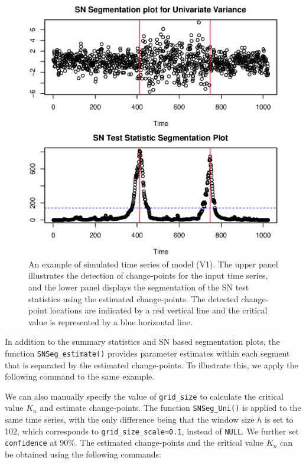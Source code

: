 \begin{figure}[!h]
	\centering
	\includegraphics[scale=0.5]{uni_var.eps}
	\caption{An example of simulated time series of model (V1). The upper panel illustrates the detection of change-points for the input time series, and the lower panel displays the segmentation of the SN test statistics using the estimated change-points. The detected change-point locations are indicated by a red vertical line and the critical value is represented by a blue horizontal line.}
	\label{fig:SN-uni-single-var}
\end{figure}

{In addition to the summary statistics and SN based segmentation plots, the function \texttt{SNSeg\_estimate()} provides parameter estimates within each segment that is separated by the estimated change-points. To illustrate this, we apply the following command to the same example.



}

We can also manually specify the value of \texttt{grid\_size} to calculate the critical value $K_n$ and estimate change-points. The function \texttt{SNSeg\_Uni()} is applied to the same time series, with the only difference being that the window size $h$ is set to 102, which corresponds to \texttt{grid\_size\_scale=0.1}, instead of \texttt{NULL}. We further set \texttt{confidence} at 90\%. The estimated change-points and the critical value $K_n$ can be obtained using the following commands:

